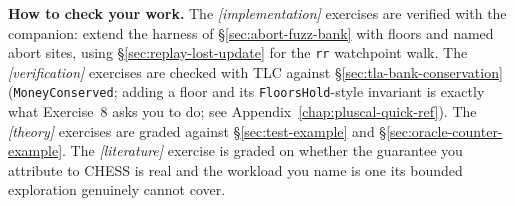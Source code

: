 \textbf{How to check your work.} The \emph{[implementation]} exercises are
verified with the companion: extend the harness of \S\ref{sec:abort-fuzz-bank}
with floors and named abort sites, using \S\ref{sec:replay-lost-update} for
the \texttt{rr} watchpoint walk.  The \emph{[verification]} exercises are
checked with TLC against \S\ref{sec:tla-bank-conservation}
(\texttt{MoneyConserved}; adding a floor and its \texttt{FloorsHold}-style
invariant is exactly what Exercise~8 asks you to do; see
Appendix~\ref{chap:pluscal-quick-ref}).  The \emph{[theory]} exercises are
graded against \S\ref{sec:test-example} and \S\ref{sec:oracle-counter-example}.
The \emph{[literature]} exercise is graded on whether the guarantee you
attribute to CHESS is real and the workload you name is one its bounded
exploration genuinely cannot cover.

